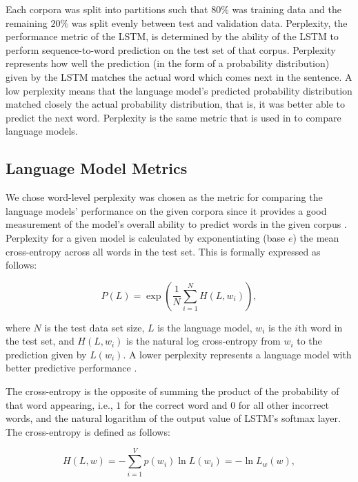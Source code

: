 \documentclass[runningheads,a4paper]{llncs}
\begin{document}
Each corpora was split into partitions such that $80\%$ was training data
and the remaining $20\%$ was split evenly between test and validation
data. Perplexity, the performance metric of the LSTM, is determined by the
ability of the LSTM to perform sequence-to-word prediction on the test
set of that corpus. Perplexity represents how well the prediction (in the
form of a probability distribution) given by the LSTM matches the actual
word which comes next in the sentence. A low perplexity means that the
language model's predicted probability distribution matched closely the
actual probability distribution, that is, it was better able to predict
the next word. Perplexity is the same metric that is used in
\citet{LSTMArticle} to compare language models.

\subsection{Language Model Metrics}

We chose word-level perplexity was chosen as the metric for comparing the
language models' performance on the given corpora since it provides
a good measurement of the model's overall ability to predict words
in the given corpus \cite{sundermeyer2015feedforward}. 
Perplexity for a given model is calculated
by exponentiating (base $e$) the mean
cross-entropy across all words in the test set. This is formally
expressed as follows:

\begin{equation}
\label{perplexity}
    P(L) = \exp\left(\frac{1}{N}\sum^{N}_{i=1} H(L,w_i)\right) ,
\end{equation}

where $N$ is the test data set size, $L$ is the language model, $w_i$
is the $i$th word in the test set, and $H(L, w_i)$ is the natural log
cross-entropy from $w_i$ to the prediction given by $L(w_i)$. A lower
perplexity represents a language model with better predictive
performance \cite{wang2016parallel}.

The cross-entropy is the opposite of summing the
product of the probability of that word appearing, i.e., $1$ for the
correct word and $0$ for all other incorrect words, and the
natural logarithm of the output value of LSTM's softmax layer.
The cross-entropy is defined as follows:

\begin{equation}
\label{cross-entropy}
    H(L,w) = - \sum_{i=1}^V p(w_i) \ln L(w_i) = - \ln L_w(w) ,
\end{equation}
\end{document}
